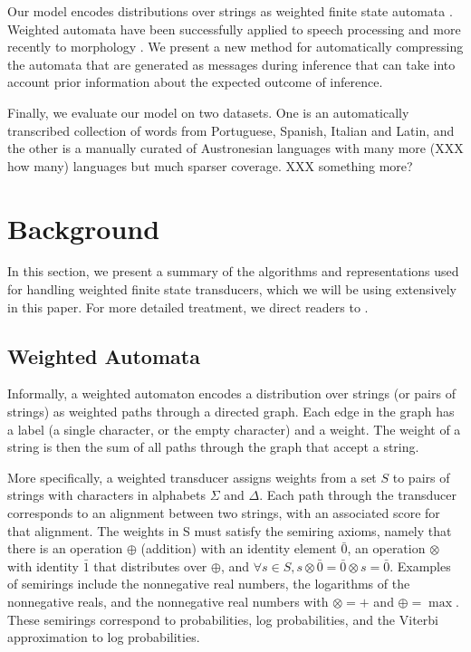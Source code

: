 \documentclass[11pt,a4paper]{article}
\begin{document}
Our model encodes distributions over strings as weighted finite
state automata \cite{mohri09weighted}. Weighted automata have been
successfully applied to speech processing \cite{Mohri96weightedautomata} and
more recently to morphology \cite{dreyer2009graphical}.  We present
a new method for automatically compressing the automata that are
generated as messages during inference that can take into account
prior information about the expected outcome of inference.

Finally, we evaluate our model on two datasets. One is an automatically
transcribed collection of words from Portuguese, Spanish, Italian
and Latin, and the other is a manually curated of Austronesian
languages with many more (XXX how many) languages but much sparser
coverage. XXX something more?

\section{Background}

In this section, we present a summary of the algorithms and
representations used for handling weighted finite state transducers,
which we will be using extensively in this paper. For more detailed
treatment, we direct readers to \cite{mohri09weighted}.

\subsection{Weighted Automata}

Informally, a weighted automaton encodes a distribution over strings
(or pairs of strings) as weighted paths through a directed graph.
Each edge in the graph has a label (a single character, or the empty
character) and a weight. The weight of a string is then the sum
of all paths through the graph that accept a string.

More specifically, a weighted transducer assigns weights from a set
$S$ to pairs of strings with characters in alphabets $\Sigma$ and
$\Delta$. Each path through the transducer corresponds to an alignment
between two strings, with an associated score for that alignment.
The weights in S must satisfy the semiring axioms, namely that there
is an operation $\oplus$ (addition) with an identity element $\bar
0$, an operation $\otimes$ with identity $\bar 1$ that distributes
over $\oplus$, and $\forall s\in S, s\otimes \bar 0 = \bar 0 \otimes
s = \bar 0$. Examples of semirings include the nonnegative real
numbers, the logarithms of the nonnegative reals, and the nonnegative
real numbers with $\otimes = +$ and $\oplus = \max$. These semirings
correspond to probabilities, log probabilities, and the Viterbi
approximation to log probabilities.
\end{document}
